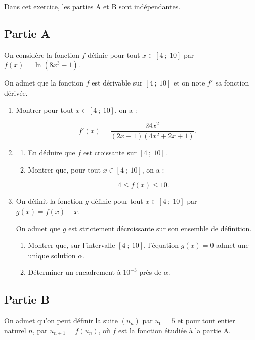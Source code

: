 Dans cet exercice, les parties A et B sont indépendantes.

\subsection*{Partie A}

On considère la fonction $f$ définie pour tout $x \in [4~;~10]$ par $f(x) = \ln(8x^3 - 1)$.

On admet que la fonction $f$ est dérivable sur $[4~;~10]$ et on note $f'$ sa fonction dérivée.

\medskip

\begin{enumerate}
\item Montrer pour tout $x \in [4~;~10]$, on a :

\[f'(x) = \frac{24x^2}{(2x-1)(4x^2+2x+1)}.\]

\item[2.] 
	\begin{enumerate}[label=\alph*.]
		\item En déduire que $f$ est croissante sur $[4~;~10]$.
		\item Montrer que, pour tout $x \in [4~;~10]$, on a :

\[4 \leqslant f(x) \leqslant 10.\]

	\end{enumerate}
\item[3.] On définit la fonction $g$ définie pour tout $x \in [4~;~10]$ par $g(x) = f(x) - x$.

On admet que $g$ est strictement décroissante sur son ensemble de définition.

\medskip

\begin{enumerate}[label=\alph*.]
\item Montrer que, sur l'intervalle $[4~;~10]$, l'équation $g(x) = 0$ admet une unique solution $\alpha$.
\item Déterminer un encadrement à $10^{-3}$ près de $\alpha$.
    \end{enumerate}
\end{enumerate}

\subsection*{Partie B}

On admet qu'on peut définir la suite $(u_n)$ par $u_0 = 5$ et pour tout entier naturel $n$, par $u_{n+1} = f(u_n)$, où $f$ est la fonction étudiée à la partie A.

